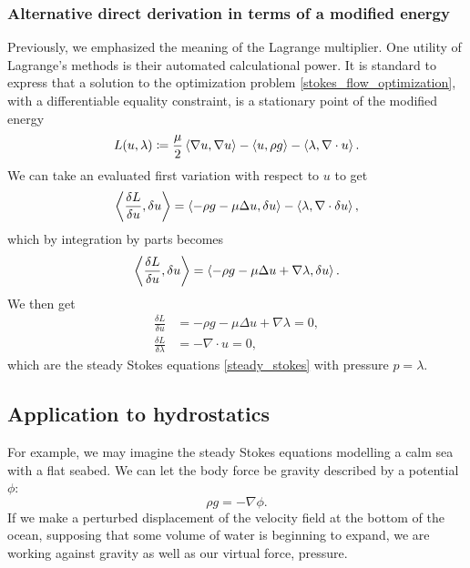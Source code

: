 \subsubsection{Alternative direct derivation in terms of a modified energy}
Previously, we emphasized the meaning of the Lagrange multiplier. One utility of Lagrange's methods is their automated calculational power.
It is standard to express that a solution to the optimization
problem \eqref{stokes_flow_optimization}, with a differentiable equality constraint, is a stationary point of the modified energy
\begin{equation}\label{stokes_flow_modified_energy}
    L(u, \lambda) \coloneqq \frac{\mu}{2} \left<\nabla u, \nabla u\right> - \left<u, \rho g\right> - \left<\lambda, \nabla\cdot u\right>.\\
\end{equation}
We can take an evaluated first variation with respect to $u$ to get
\begin{align*}
    \left<\frac{\delta L}{\delta u}, \delta u\right> = \left<-\rho g - \mu\Delta u, \delta u\right> - \left<\lambda, \nabla\cdot\delta u\right>,
\end{align*}
which by integration by parts becomes
\begin{equation}
    \left<\frac{\delta L}{\delta u}, \delta u\right> = \left<-\rho g - \mu\Delta u + \nabla \lambda, \delta u\right>.
\end{equation}
We then get
\begin{equation}
\begin{split}
    \frac{\delta L}{\delta u} &= -\rho g - \mu\Delta u + \nabla \lambda = 0,\\
    \frac{\delta L}{\delta \lambda} &= -\nabla\cdot u = 0,
\end{split}
\end{equation}
which are the steady Stokes equations \eqref{steady_stokes} with pressure $p = \lambda$.



\subsection{Application to hydrostatics}
For example, we may imagine the steady Stokes equations modelling a calm sea with a flat seabed.
We can let the body force be gravity described by a potential $\phi$:
    $$\rho g = -\nabla \phi.$$
If we make a perturbed displacement of the velocity field at the bottom of the ocean, supposing that some volume of water
is beginning to expand,
we are working against gravity as well as our virtual force, pressure.

